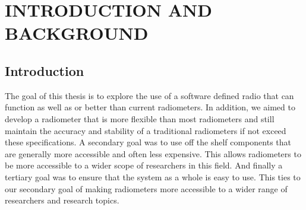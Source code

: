 \chapter{INTRODUCTION AND  BACKGROUND}




\section{Introduction}
The goal of this thesis is to explore the use of a software defined radio that can function as well as or better than current radiometers.  In addition, we aimed to develop a radiometer that is more flexible than most radiometers and still maintain the accuracy and stability of a traditional radiometers if not exceed these specifications.  A secondary goal was to use off the shelf components that are generally more accessible and often less expensive.  This allows radiometers to be more accessible to a wider scope of researchers in this field.  And finally a tertiary goal was to ensure that the system as a whole is easy to use.  This ties to our secondary goal of making radiometers more accessible to a wider range of researchers and research topics.

